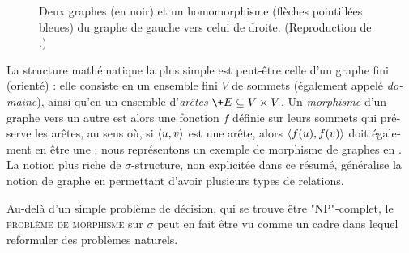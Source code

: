 \begin{french}
\begin{figure}
	\centering
	\caption{
		\AP\label{fig:example-graph-homomorphism-fr}
		Deux graphes (en noir) et un homomorphisme (flèches pointillées bleues) du graphe de gauche vers celui de droite.
		(Reproduction de .)
	}
\end{figure}
La structure mathématique la plus simple est peut-être celle d’un graphe fini (orienté) :
elle consiste en un ensemble fini $V$ de sommets (également appelé \emph{domaine}),
ainsi qu’en un ensemble d’\emph{arêtes} $\+E \subseteq V \times V$.
Un \emph{morphisme} d’un graphe vers un autre est alors une fonction $f$ définie sur leurs sommets qui préserve les arêtes, au sens où, si $\langle u,v\rangle$ est une arête, alors $\langle f(u),f(v)\rangle$ doit également en être une :
nous représentons un exemple de morphisme de graphes en .
La notion plus riche de $\sigma$-structure, non explicitée dans ce résumé, généralise
la notion de graphe en permettant d'avoir plusieurs types de relations.

Au-delà d'un simple problème de décision, qui se trouve être "NP"-complet,
le \textsc{problème de morphisme} sur $\sigma$ peut en fait être vu comme un 
cadre dans lequel reformuler des problèmes naturels.


\end{french}

